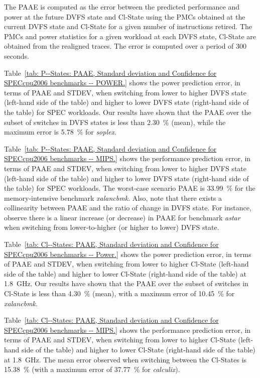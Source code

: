 The PAAE is computed as the error between the predicted performance and power at the
future DVFS state and Cl-State using the PMCs obtained at the current DVFS state and
Cl-State for a given number of instructions retired.  The PMCs and power statistics for a
given workload at each DVFS state, Cl-State are obtained from the realigned traces.  The
error is computed over a period of 300 seconds.

 Table~\ref{tab: P--States: PAAE, Standard deviation and Confidence for
SPECcpu2006 benchmarks -- POWER.} shows the power prediction error, in terms of PAAE and
STDEV, when switching from lower to higher DVFS state (left-hand side of the table) and
higher to lower DVFS state (right-hand side of the table) for SPEC workloads.  Our results
have shown that the PAAE over the subset of switches in DVFS states is less than
\SI{2.30}{\percent} (mean), while the maximum error is \SI{5.78}{\percent} for
\emph{soplex}.

 Table~\ref{tab: P--States: PAAE, Standard deviation and Confidence for
SPECcpu2006 benchmarks -- MIPS.} shows the performance prediction error, in terms of PAAE
and STDEV, when switching from lower to higher DVFS state (left-hand side of the table)
and higher to lower DVFS state (right-hand side of the table) for SPEC workloads. The
worst-case scenario PAAE is \SI{33.99}{\percent} for the memory-intensive benchmark
\emph{xalancbmk}.  Also, note that there exists a collinearity between PAAE and the ratio
of change in DVFS state.  For instance, observe there is a linear increase (or decrease)
in PAAE for benchmark \emph{astar} when switching from lower-to-higher (or higher to
lower) DVFS state.

 Table~\ref{tab: Cl--States: PAAE, Standard deviation and Confidence for
SPECcpu2006 benchmarks -- Power.} shows the power prediction error, in terms of PAAE and
STDEV, when switching from lower to higher Cl-State (left-hand side of the table) and
higher to lower Cl-State (right-hand side of the table) at \SI{1.8}{\giga\hertz}.   Our
results have shown that the PAAE over the subset of switches in Cl-State is less than
\SI{4.30}{\percent} (mean), with a maximum error of \SI{10.45}{\percent} for
\emph{xalancbmk}. 

 Table~\ref{tab: Cl--States: PAAE, Standard deviation and Confidence for
SPECcpu2006 benchmarks -- MIPS.} shows the performance prediction error, in terms of PAAE
and STDEV, when switching from lower to higher Cl-State (left-hand side of the table) and
higher to lower Cl-State (right-hand side of the table) at \SI{1.8}{\giga\hertz}.  The
mean error observed when switching between the Cl-States is \SI{15.38}{\percent} (with a
maximum error of \SI{37.77}{\percent} for \emph{calculix}). 

